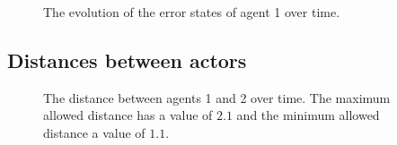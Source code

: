 \begin{figure}[H]\centering
  \scalebox{0.7}{}
  \caption{The evolution of the error states of agent 1 over time.}
  \label{fig:d_OFF_3_2_errors_agent_1}
\end{figure}

\noindent{}


\subsection{Distances between actors}
\label{subsection:d_OFF_distances_3_2}

\begin{figure}[H]\centering
  \scalebox{0.7}{}
  \caption{The distance between agents 1 and 2 over time. The maximum allowed
    distance has a value of $2.1$ and the minimum allowed distance a value
    of $1.1$.}
  \label{fig:d_OFF_3_2_distance_agents_12}
\end{figure}

